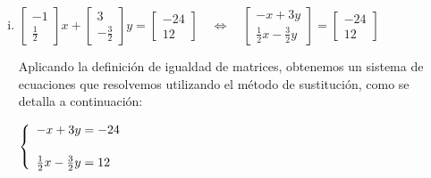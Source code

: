 \documentclass[11pt]{article}
\newcommand{\indicador}[4]{
{\tikz[remember picture,overlay]\coordinate (#1) at #2;}{\tikz[remember picture,overlay]\coordinate (#3) at #4;} 
}
\newcommand{\marka}[2]{
{\tikz[remember picture,overlay]\coordinate (#1) at #2;}
}
\begin{document}
\begin{enumerate}[\hspace{-5mm} 1) ]
\begin{enumerate}[a)]
\begin{enumerate}[a)]
\begin{enumerate}[i)]
\bigskip
        
        \item  $\begin{bmatrix} -1 \\ \tfrac{1}{2} \end{bmatrix}x 
        +
        \begin{bmatrix}3 \\ -\tfrac{3}{2} \end{bmatrix} y
        = \begin{bmatrix} -24 \\ 12 \end{bmatrix}  
        \quad
        \Longleftrightarrow
        \quad
        \begin{bmatrix}-x + 3y \\ \tfrac{1}{2} x -\tfrac{3}{2} y\end{bmatrix} 
        = \begin{bmatrix} -24 \\ 12 \end{bmatrix}
        $

\medskip

 Aplicando la definición de igualdad de matrices, obtenemos un sistema de ecuaciones que resolvemos utilizando el método de sustitución, como se detalla a continuación:

\medskip

$\left\{\begin{array}{l}         
        -x+3y= -24 \indicador{x}{(.1,.15)}{y}{(1.3,.15)}
        \\[5mm]
        \tfrac{1}{2}x -  \tfrac{3}{2} y = 12 \marka{a}{(.1,.15)} 
        \end{array}\right.$


\end{enumerate}
\end{enumerate}
\end{enumerate}
\end{enumerate}
\end{document}
